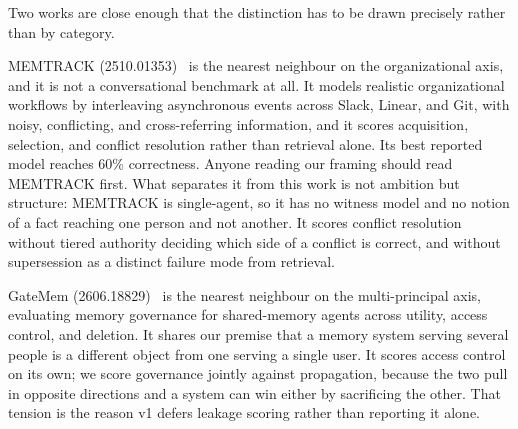 \documentclass[11pt]{article}
\begin{document}
Two works are close enough that the distinction has to be drawn precisely rather
than by category.

MEMTRACK (2510.01353)~\cite{memtrack} is the nearest neighbour on the organizational axis, and it
is not a conversational benchmark at all. It models realistic organizational
workflows by interleaving asynchronous events across Slack, Linear, and Git, with
noisy, conflicting, and cross-referring information, and it scores acquisition,
selection, and conflict resolution rather than retrieval alone. Its best reported
model reaches 60\% correctness. Anyone reading our framing should read MEMTRACK
first. What separates it from this work is not ambition but structure: MEMTRACK
is single-agent, so it has no witness model and no notion of a fact reaching one
person and not another. It scores conflict resolution without tiered authority
deciding which side of a conflict is correct, and without supersession as a
distinct failure mode from retrieval.

GateMem (2606.18829)~\cite{gatemem} is the nearest neighbour on the multi-principal axis,
evaluating memory governance for shared-memory agents across utility, access
control, and deletion. It shares our premise that a memory system serving several
people is a different object from one serving a single user. It scores access
control on its own; we score governance jointly against propagation, because the
two pull in opposite directions and a system can win either by sacrificing the
other. That tension is the reason v1 defers leakage scoring rather than reporting
it alone.
\end{document}
